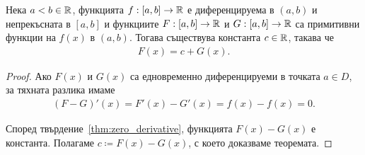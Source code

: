 \documentclass[numbers=endperiod, bibliography=totocnumbered]{scrartcl}
\begin{document}
\begin{theorem}
Нека \( a < b \in \mathbb{R} \), функцията \( f: [a, b] \to \mathbb{R} \) е диференцируема в \( (a, b) \) и непрекъсната в \( [a, b] \) и функциите \( F: [a, b] \to \mathbb{R} \) и \( G: [a, b] \to \mathbb{R} \) са примитивни функции на \( f(x) \) в \( (a, b) \). Тогава съществува константа \( c \in \mathbb{R} \), такава че
  \begin{align*}
    F(x) = c + G(x).
  \end{align*}
\end{theorem}
\begin{proof}
  Ако \( F(x) \) и \( G(x) \) са едновременно диференцируеми в точката \( a \in D \), за тяхната разлика имаме
  \begin{align*}
    (F - G)'(x)
    =
    F'(x) - G'(x)
    =
    f(x) - f(x)
    =
    0.
  \end{align*}

  Според твърдение~\ref{thm:zero_derivative}, функцията \( F(x) - G(x) \) е константа. Полагаме \( c \coloneqq F(x) - G(x) \), с което доказваме теоремата.
\end{proof}

\printbibliography
\end{document}
